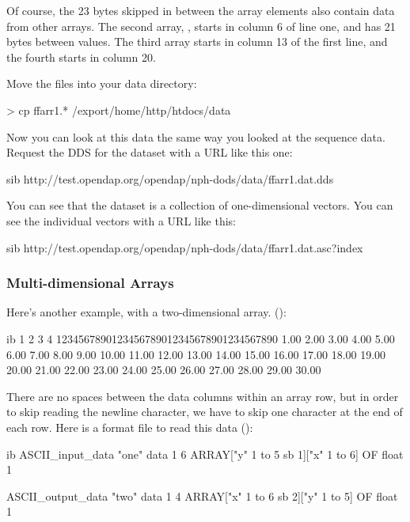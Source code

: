 Of course, the 23 bytes skipped in between the  array
elements also contain data from other arrays.  The second array,
, starts in column 6 of line one, and has 21 bytes between
values.  The third array starts in column 13 of the first line, and
the fourth starts in column 20.

Move the  files into your data directory:

\begin{example}
> cp ffarr1.* /export/home/http/htdocs/data
\end{example}

Now you can look at this data the same way you looked at the sequence
data.  Request the DDS for the dataset with a URL like this one:

\begin{vcode}{sib}
http://test.opendap.org/opendap/nph-dods/data/ffarr1.dat.dds
\end{vcode}

You can see that the dataset is a collection of one-dimensional
vectors.  You can see the individual vectors with a URL like this:

\begin{vcode}{sib}
http://test.opendap.org/opendap/nph-dods/data/ffarr1.dat.asc?index
\end{vcode}

\subsubsection{Multi-dimensional Arrays}

Here's another example, with a two-dimensional array.
():

\begin{vcode}{ib}
         1         2         3         4
1234567890123456789012345678901234567890
  1.00  2.00  3.00  4.00  5.00  6.00
  7.00  8.00  9.00 10.00 11.00 12.00
 13.00 14.00 15.00 16.00 17.00 18.00
 19.00 20.00 21.00 22.00 23.00 24.00
 25.00 26.00 27.00 28.00 29.00 30.00
\end{vcode}

There are no spaces between the data columns within an array row, but in
order to skip reading the newline character, we have to skip one
character at the end of each row.  Here is a format file to read this
data ():

\begin{vcode}{ib}
ASCII_input_data "one"
data 1 6 ARRAY["y" 1 to 5 sb 1]["x" 1 to 6] OF float 1

ASCII_output_data "two"
data 1 4 ARRAY["x" 1 to 6 sb 2]["y" 1 to 5] OF float 1
\end{vcode}

